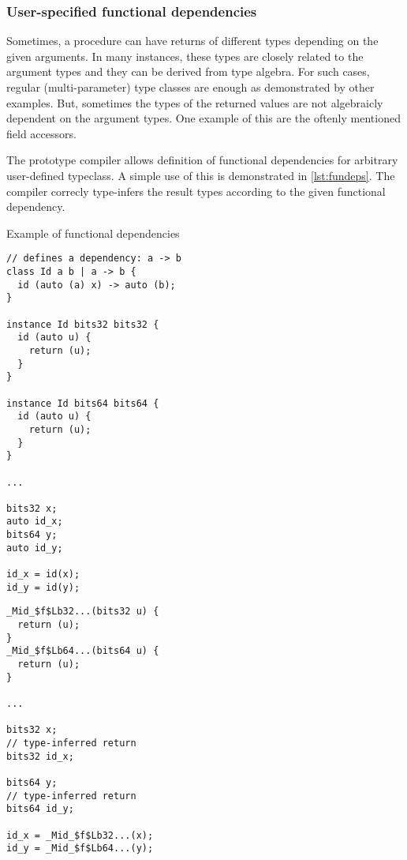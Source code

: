 \subsubsection{User-specified functional dependencies}

Sometimes, a procedure can have returns of different types depending on the given arguments. In many instances, these types are closely related to the argument types and they can be derived from type algebra. For such cases, regular (multi-parameter) type classes are enough as demonstrated by other examples. But, sometimes the types of the returned values are not algebraicly dependent on the argument types. One example of this are the oftenly mentioned field accessors.

The prototype compiler allows definition of functional dependencies for arbitrary user-defined typeclass. A simple use of this is demonstrated in \cref{lst:fundeps}. The compiler correcly type-infers the result types according to the given functional dependency.

\begin{listing}
    \caption{Example of functional dependencies}
    \label{lst:fundeps}
    \begin{center}
    \begin{minipage}{0.5\linewidth}
    \begin{lstlisting}
// defines a dependency: a -> b
class Id a b | a -> b {
  id (auto (a) x) -> auto (b);
}

instance Id bits32 bits32 {
  id (auto u) {
    return (u);
  }
}

instance Id bits64 bits64 {
  id (auto u) {
    return (u);
  }
}

...

bits32 x;
auto id_x;
bits64 y;
auto id_y;

id_x = id(x);
id_y = id(y);
    \end{lstlisting}
    \end{minipage}%
    \begin{minipage}{0.5\linewidth}
    \begin{lstlisting}
_Mid_$f$Lb32...(bits32 u) {
  return (u);
}
_Mid_$f$Lb64...(bits64 u) {
  return (u);
}

...

bits32 x;
// type-inferred return
bits32 id_x;

bits64 y;
// type-inferred return
bits64 id_y;

id_x = _Mid_$f$Lb32...(x);
id_y = _Mid_$f$Lb64...(y);
    \end{lstlisting}
    \end{minipage}
    \end{center}
\end{listing}


